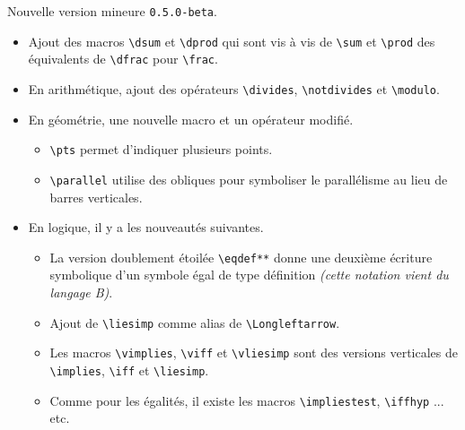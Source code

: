 Nouvelle version mineure \verb+0.5.0-beta+.

\begin{itemize}[itemsep=.5em]
    \item Ajout des macros \verb+\dsum+ et \verb+\dprod+ qui sont vis à vis de \verb+\sum+ et \verb+\prod+ des équivalents de \verb+\dfrac+ pour \verb+\frac+.


    \item En arithmétique, ajout des opérateurs \verb+\divides+, \verb+\notdivides+ et \verb+\modulo+.


    \item En géométrie, une nouvelle macro et un opérateur modifié.
    \begin{itemize}[itemsep=.5em]
        \item \verb+\pts+ permet d'indiquer plusieurs points.

        \item \verb+\parallel+ utilise des obliques pour symboliser le parallélisme au lieu de barres verticales.
    \end{itemize}


    \item En logique, il y a les nouveautés suivantes.
    \begin{itemize}[itemsep=.5em]
        \item La version doublement étoilée \verb+\eqdef**+ donne une deuxième écriture symbolique d'un symbole égal de type définition \emph{(cette notation vient du langage B)}.

        \item Ajout de \verb+\liesimp+ comme alias de \verb+\Longleftarrow+.

        \item Les macros \verb+\vimplies+, \verb+\viff+ et \verb+\vliesimp+ sont des versions verticales de \verb+\implies+, \verb+\iff+ et \verb+\liesimp+.

        \item Comme pour les égalités, il existe les macros \verb+\impliestest+, \verb+\iffhyp+ ... etc.
    \end{itemize}
\end{itemize}
